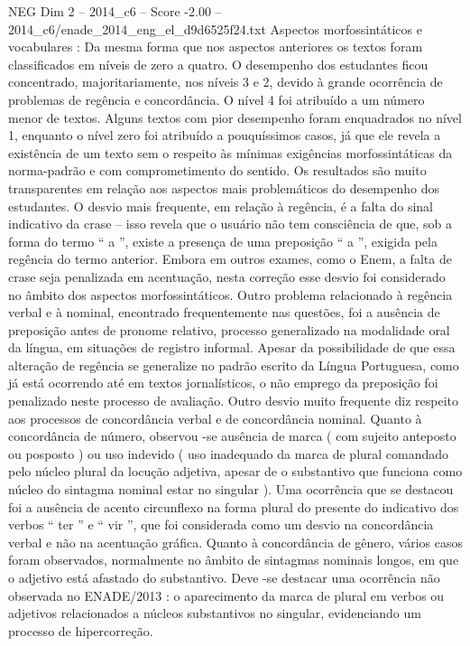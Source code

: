\begin{textsample}{NEG Dim 2 – 2014\_c6 – Score -2.00 – 2014\_c6/enade\_2014\_eng\_el\_d9d6525f24.txt}
Aspectos morfossintáticos e vocabulares : Da mesma forma que nos aspectos anteriores os textos foram classificados em níveis de zero a quatro.
O desempenho dos estudantes ficou concentrado, majoritariamente, nos níveis 3 e 2, devido à grande ocorrência de problemas de regência e concordância.
O nível 4 foi atribuído a um número menor de textos.
Alguns textos com pior desempenho foram enquadrados no nível 1, enquanto o nível zero foi atribuído a pouquíssimos casos, já que ele revela a existência de um texto sem o respeito às mínimas exigências morfossintáticas da norma-padrão e com comprometimento do sentido.
Os resultados são muito transparentes em relação aos aspectos mais problemáticos do desempenho dos estudantes.
O desvio mais frequente, em relação à regência, é a falta do sinal indicativo da crase – isso revela que o usuário não tem consciência de que, sob a forma do termo “ a ”, existe a presença de uma preposição “ a ”, exigida pela regência do termo anterior.
Embora em outros exames, como o Enem, a falta de crase seja penalizada em acentuação, nesta correção esse desvio foi considerado no âmbito dos aspectos morfossintáticos.
Outro problema relacionado à regência verbal e à nominal, encontrado frequentemente nas questões, foi a ausência de preposição antes de pronome relativo, processo generalizado na modalidade oral da língua, em situações de registro informal.
Apesar da possibilidade de que essa alteração de regência se generalize no padrão escrito da Língua Portuguesa, como já está ocorrendo até em textos jornalísticos, o não emprego da preposição foi penalizado neste processo de avaliação.
Outro desvio muito frequente diz respeito aos processos de concordância verbal e de concordância nominal.
Quanto à concordância de número, observou -se ausência de marca ( com sujeito anteposto ou posposto ) ou uso indevido ( uso inadequado da marca de plural comandado pelo núcleo plural da locução adjetiva, apesar de o substantivo que funciona como núcleo do sintagma nominal estar no singular ).
Uma ocorrência que se destacou foi a ausência de acento circunflexo na forma plural do presente do indicativo dos verbos “ ter ” e “ vir ”, que foi considerada como um desvio na concordância verbal e não na acentuação gráfica.
Quanto à concordância de gênero, vários casos foram observados, normalmente no âmbito de sintagmas nominais longos, em que o adjetivo está afastado do substantivo.
Deve -se destacar uma ocorrência não observada no ENADE/2013 : o aparecimento da marca de plural em verbos ou adjetivos relacionados a núcleos substantivos no singular, evidenciando um processo de hipercorreção.

\end{textsample}
